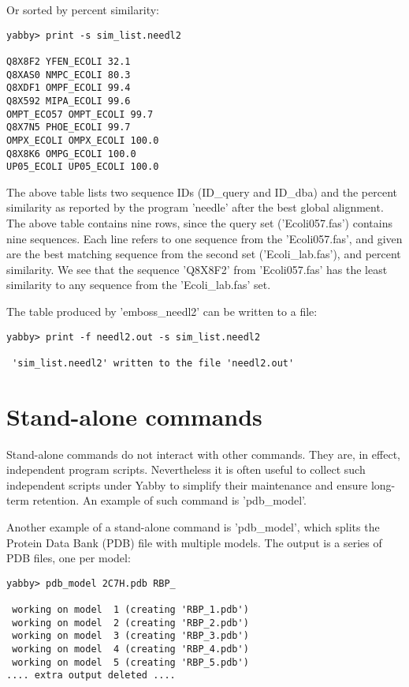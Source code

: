Or sorted by percent similarity:

\begin{verbatim}
yabby> print -s sim_list.needl2

Q8X8F2 YFEN_ECOLI 32.1
Q8XAS0 NMPC_ECOLI 80.3
Q8XDF1 OMPF_ECOLI 99.4
Q8X592 MIPA_ECOLI 99.6
OMPT_ECO57 OMPT_ECOLI 99.7
Q8X7N5 PHOE_ECOLI 99.7
OMPX_ECOLI OMPX_ECOLI 100.0
Q8X8K6 OMPG_ECOLI 100.0
UP05_ECOLI UP05_ECOLI 100.0
\end{verbatim}

The above table lists two sequence IDs (ID\_query and ID\_dba) and
the percent similarity as reported by the program 'needle' after
the best global alignment.  The above table contains nine rows,
since the query set ('Ecoli057.fas') contains nine sequences.  Each
line refers to one sequence from the 'Ecoli057.fas', and given are
the best matching sequence from the second set ('Ecoli\_lab.fas'),
and percent similarity. We see that the sequence 'Q8X8F2' from
'Ecoli057.fas' has the least similarity to any sequence from the
'Ecoli\_lab.fas' set.

The table produced by 'emboss\_needl2' can be written to a file:

\begin{verbatim}
yabby> print -f needl2.out -s sim_list.needl2

 'sim_list.needl2' written to the file 'needl2.out'
\end{verbatim}


\section{Stand-alone commands}

Stand-alone commands do not interact with other commands. They
are, in effect, independent program scripts.  Nevertheless it is
often useful to collect such independent scripts under Yabby
to simplify their maintenance and ensure long-term retention.
An example of such command is 'pdb\_model'.


Another example of a stand-alone command is 'pdb\_model', which 
splits the Protein Data Bank (PDB) file with multiple models.
The output is a series of PDB files, one per model:

\begin{verbatim}
yabby> pdb_model 2C7H.pdb RBP_

 working on model  1 (creating 'RBP_1.pdb')
 working on model  2 (creating 'RBP_2.pdb')
 working on model  3 (creating 'RBP_3.pdb')
 working on model  4 (creating 'RBP_4.pdb')
 working on model  5 (creating 'RBP_5.pdb')
.... extra output deleted ....
\end{verbatim}

